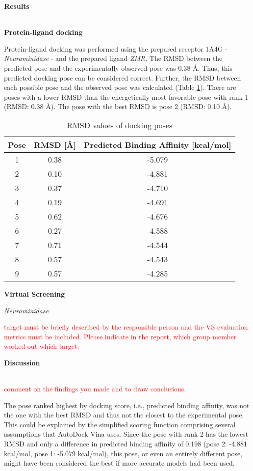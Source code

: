 \documentclass[a4paper,10pt]{article}
\begin{document}
\begin{large}
	\vspace{0.5cm}
	\textbf{Results}
\end{large}	\\ [1mm]

\textbf{Protein-ligand docking}

Protein-ligand docking was performed using the prepared receptor 1A4G - \textit{Neuraminidase} - and the prepared ligand \textit{ZMR}. The RMSD between the predicted pose and the experimentally observed pose was 0.38 Å. Thus, this predicted docking pose can be considered correct. Further, the RMSD between each possible pose and the observed pose was calculated (Table \ref{tab:rmsd}). There are poses with a lower RMSD than the energetically most favorable pose with rank 1 (RMSD: 0.38 Å). The pose with the best RMSD is pose 2 (RMSD: 0.10 Å).

\begin{table}[h!]
\centering
\caption{RMSD values of docking poses}
\label{tab:rmsd}
\begin{tabular}{|c|c|c|}
\hline
\textbf{Pose} & \textbf{RMSD [\AA]} & \textbf{Predicted Binding Affinity [kcal/mol]} \\
\hline
1 & 0.38 & -5.079\\
2 & 0.10 & -4.881\\
3 & 0.37 & -4.710\\
4 & 0.19 & -4.691\\
5 & 0.62 & -4.676\\
6 & 0.27 & -4.588\\
7 & 0.71 & -4.544\\
8 & 0.57 & -4.543\\
9 & 0.57 & -4.285\\
\hline
\end{tabular}
\end{table}


\textbf{Virtual Screening}

\textit{Neuraminidase}


\textcolor{red}{target must be
briefly described by the responsible person and the VS evaluation metrics must be included. Please indicate in
the report, which group member worked out which target.}

\begin{large}
	\vspace{0.5cm}
	\textbf{Discussion}
\end{large}	\\ [1mm]

\textcolor{red}{comment on the findings you made and to draw conclusions.}

The pose ranked highest by docking score, i.e., predicted binding affinity, was not the one with the best RMSD and thus not the closest to the experimental pose. This could be explained by the simplified scoring function comprising several assumptions that AutoDock Vina uses. Since the pose with rank 2 has the lowest RMSD and only a difference in predicted binding affinity of 0.198 (pose 2: -4.881 kcal/mol, pose 1: -5.079 kcal/mol), this pose, or even an entirely different pose, might have been considered the best if more accurate models had been used. 



\end{document}
